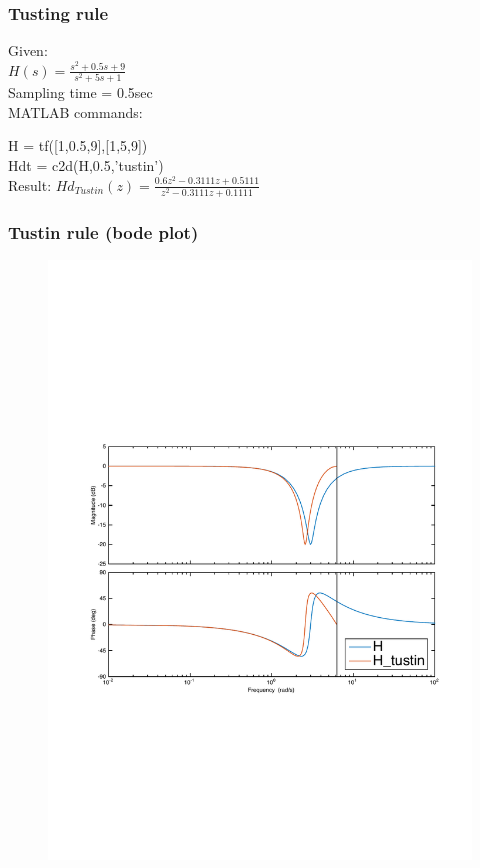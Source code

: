 \begin{frame}
	\frametitle{Tusting rule}
	\begin{example}
		Given:\\
		$H(s) = \frac{s^{2} + 0.5s + 9}{s^{2} + 5s + 1}$\\
		Sampling time = 0.5sec\\
		\vspace{1em}
		MATLAB commands:
		
		H = tf([1,0.5,9],[1,5,9]) \\
		Hdt = c2d(H,0.5,'tustin')\\
		\vspace{1em}
		Result: 
		$Hd_{Tustin}(z) = \frac{0.6z^{2} - 0.3111z + 0.5111}{z^{2} -  0.3111z + 0.1111}$
	\end{example}
\end{frame}

\begin{frame}
	\frametitle{Tustin rule (bode plot)}
	\vspace{-0.7em}
	\begin{figure}
		\centering
		\includegraphics[width=0.9\linewidth]{distortion_bode2}
	\end{figure}
\end{frame}

